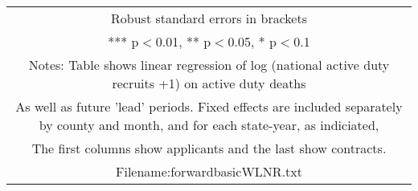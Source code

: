 \documentclass[]{article}
\begin{document}
\begin{tabular}{lcccccc}
\multicolumn{7}{c}{ Robust standard errors in brackets} \\
\multicolumn{7}{c}{ *** p$<$0.01, ** p$<$0.05, * p$<$0.1} \\
\multicolumn{7}{c}{ Notes: Table shows linear regression of log (national active duty recruits +1) on active duty deaths} \\
\multicolumn{7}{c}{ As well as future 'lead' periods. Fixed effects are included separately by county and month, and for each state-year, as indiciated,} \\
\multicolumn{7}{c}{ The first columns show applicants and the last show contracts.} \\
\multicolumn{7}{c}{ Filename:forwardbasicWLNR.txt} \\
\end{tabular}
\end{document}
